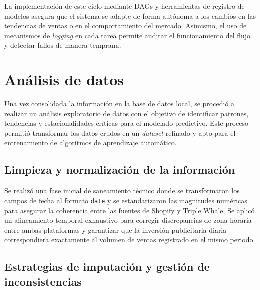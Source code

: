 La implementación de este ciclo mediante DAGs y herramientas de registro de modelos asegura que el sistema se adapte de forma autónoma a los cambios en las tendencias de ventas o en el comportamiento del mercado. Asimismo, el uso de mecanismos de \textit{logging} en cada tarea permite auditar el funcionamiento del flujo y detectar fallos de manera temprana.


\section{Análisis de datos}



Una vez consolidada la información en la base de datos local, se procedió a realizar un análisis exploratorio de datos con el objetivo de identificar patrones, tendencias y estacionalidades críticas para el modelado predictivo. Este proceso permitió transformar los datos crudos en un \textit{dataset} refinado y apto para el entrenamiento de algoritmos de aprendizaje automático.

\subsection{Limpieza y normalización de la información}

Se realizó una fase inicial de saneamiento técnico donde se transformaron los campos de fecha al formato \texttt{date} y se estandarizaron las magnitudes numéricas para asegurar la coherencia entre las fuentes de Shopify y Triple Whale. Se aplicó un alineamiento temporal exhaustivo para corregir discrepancias de zona horaria entre ambas plataformas y garantizar que la inversión publicitaria diaria correspondiera exactamente al volumen de ventas registrado en el mismo periodo.

\subsection{Estrategias de imputación y gestión de inconsistencias}

